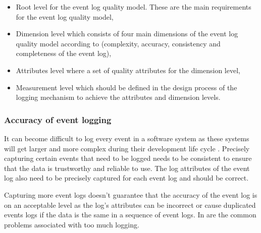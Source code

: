 \begin{itemize}
	\item Root level for the event log quality model. These are the main requirements for the event log quality model,
	\item Dimension level which consists of four main dimensions of the event log quality model according to \cite{Kherbouche2017} (complexity, accuracy, consistency and completeness of the event log),
	\item Attributes level where a set of quality attributes for the dimension level,
	\item Measurement level which should be defined in the design process of the logging mechanism to achieve the attributes and dimension levels.
\end{itemize}

\clearpage

\subsubsection{Accuracy of event logging} 
It can become difficult to log every event in a software system as these systems will get larger and more complex during their development life cycle \cite{Stojanov2017}. Precisely capturing certain events that need to be logged needs to be consistent to ensure that the data is trustworthy and reliable to use. The log attributes of the event log also need to be precisely captured for each event log and should be correct.\par Capturing more event logs doesn't guarantee that the accuracy of the event log is on an acceptable level as the log's attributes can be incorrect or cause duplicated events logs if the data is the same in a sequence of event logs. In  are the common problems associated with too much logging.


